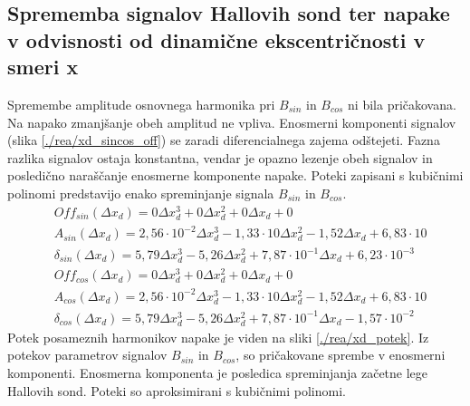 \subsection{Sprememba signalov Hallovih sond ter napake v odvisnosti od dinamične ekscentričnosti v smeri x}
Spremembe amplitude osnovnega harmonika pri $B_{sin}$ in $B_{cos}$ ni bila pričakovana. Na napako zmanjšanje obeh amplitud ne vpliva. Enosmerni komponenti signalov (slika \ref{./rea/xd_sincos_off}) se zaradi diferencialnega zajema odštejeti. Fazna razlika signalov ostaja konstantna, vendar je opazno lezenje obeh signalov in posledično naraščanje enosmerne komponente napake.
Poteki zapisani s kubičnimi polinomi predstavijo enako spreminjanje signala $B_{sin}$ in $B_{cos}$.
\begin{eqnarray}
&Off_{sin}(\Delta x_d) =0\Delta x_d^{3}+0\Delta x_d^{2}+0\Delta x_d+0 \\
&A_{sin}(\Delta x_d) =2,56\cdot 10^{-2}\Delta x_d^{3}-1,33\cdot 10\Delta x_d^{2}-1,52\Delta x_d+6,83\cdot 10 \\                          
&\delta_{sin}(\Delta x_d) =5,79\Delta x_d^{3}-5,26\Delta x_d^{2}+7,87\cdot 10^{-1}\Delta x_d+6,23\cdot 10^{-3} \\                               
&Off_{cos}(\Delta x_d) =0\Delta x_d^{3}+0\Delta x_d^{2}+0\Delta x_d+0 \\
&A_{cos}(\Delta x_d) =2,56\cdot 10^{-2}\Delta x_d^{3}-1,33\cdot 10\Delta x_d^{2}-1,52\Delta x_d+6,83\cdot 10 \\                          
&\delta_{cos}(\Delta x_d) =5,79\Delta x_d^{3}-5,26\Delta x_d^{2}+7,87\cdot 10^{-1}\Delta x_d-1,57\cdot 10^{-2}
\end{eqnarray}
Potek posameznih harmonikov napake je viden na sliki \ref{./rea/xd_potek}. Iz potekov parametrov signalov $B_{sin}$ in $B_{cos}$, so pričakovane sprembe v enosmerni komponenti. Enosmerna komponenta je posledica spreminjanja začetne lege Hallovih sond.  Poteki so aproksimirani s kubičnimi polinomi.
